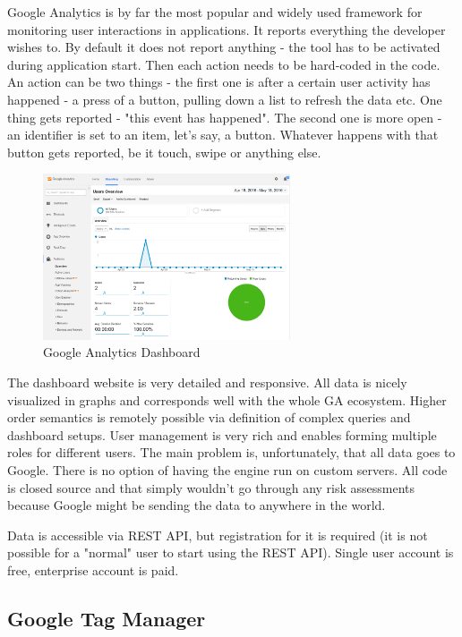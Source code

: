 Google Analytics is by far the most popular and widely used framework for monitoring user interactions in applications. It reports everything the developer wishes to. By default it does not report anything - the tool has to be activated during application start. Then each action needs to be hard-coded in the code. An action can be two things - the first one is after a certain user activity has happened - a press of a button, pulling down a list to refresh the data etc. One thing gets reported - "this event has happened". The second one is more open - an identifier is set to an item, let's say, a button. Whatever happens with that button gets reported, be it touch, swipe or anything else.

\begin{figure}[!ht]
	\centering
	\includegraphics[width=0.65\textwidth]{figures/analytics}
    \caption{Google Analytics Dashboard}
\end{figure}

The dashboard website is very detailed and responsive. All data is nicely visualized in graphs and corresponds well with the whole GA ecosystem. Higher order semantics is remotely possible via definition of complex queries and dashboard setups. User management is very rich and enables forming multiple roles for different users. The main problem is, unfortunately, that all data goes to Google. There is no option of having the engine run on custom servers. All code is closed source and that simply wouldn't go through any risk assessments because Google might be sending the data to anywhere in the world.

Data is accessible via REST API, but registration for it is required (it is not possible for a "normal" user to start using the REST API). Single user account is free, enterprise account is paid.

\subsection{Google Tag Manager}

